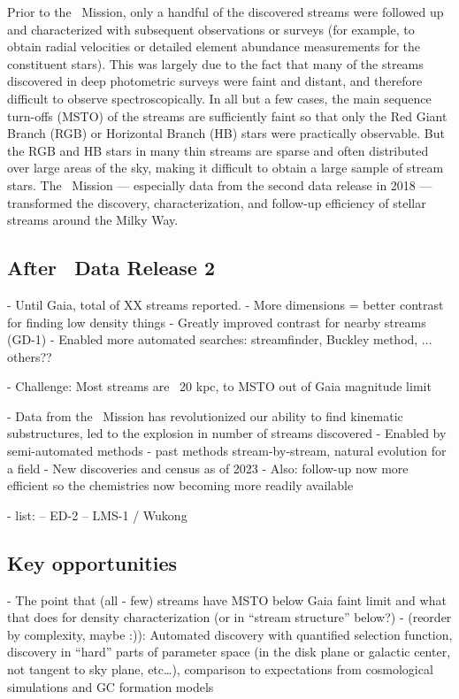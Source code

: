 \documentclass[final,5p,times,twocolumn,authoryear]{elsarticle}
\begin{document}
Prior to the \gaia\ Mission, only a handful of the discovered streams were followed up
and characterized with subsequent observations or surveys (for example, to obtain radial
velocities or detailed element abundance measurements for the constituent stars).
This was largely due to the fact that many of the streams discovered in deep photometric
surveys were faint and distant, and therefore difficult to observe spectroscopically.
In all but a few cases, the main sequence turn-offs (MSTO) of the streams are
sufficiently faint so that only the Red Giant Branch (RGB) or Horizontal Branch (HB)
stars were practically observable.
But the RGB and HB stars in many thin streams are sparse and often distributed over
large areas of the sky, making it difficult to obtain a large sample of stream stars.
The \gaia\ Mission --- especially data from the second data release in 2018 ---
transformed the discovery, characterization, and follow-up efficiency of stellar streams
around the Milky Way.


\subsection{After \gaia\ Data Release 2}

- Until Gaia, total of XX streams reported.
- More dimensions = better contrast for finding low density things
- Greatly improved contrast for nearby streams (GD-1)
- Enabled more automated searches: streamfinder, Buckley method, ... others??

- Challenge: Most streams are ~20 kpc, to MSTO out of Gaia magnitude limit

- Data from the \gaia\ Mission has revolutionized our ability to find kinematic substructures, led to the explosion in number of streams discovered
- Enabled by semi-automated methods - past methods stream-by-stream, natural evolution for a field
- New discoveries and census as of 2023
- Also: follow-up now more efficient so the chemistries now becoming more readily available

- list:
-- ED-2
-- LMS-1 / Wukong

\subsection{Key opportunities}
- The point that (all - few) streams have MSTO below Gaia faint limit and what that does for density characterization (or in “stream structure” below?)
- (reorder by complexity, maybe :)): Automated discovery with quantified selection function, discovery in “hard” parts of parameter space (in the disk plane or galactic center, not tangent to sky plane, etc…), comparison to expectations from cosmological simulations and GC formation models
\end{document}
